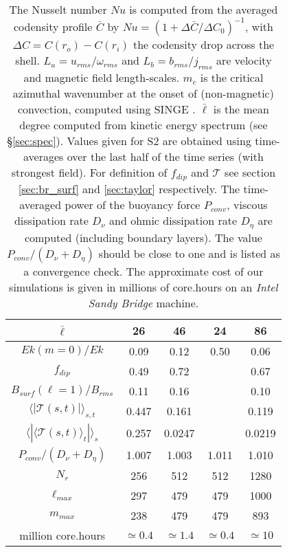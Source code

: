 \documentclass[12pt, a4paper]{article}
\begin{document}
\begin{table}
\begin{center}
\begin{tabular}{ccccc}
$\bar{\ell}$ & 26 & 46 & 24 & 86 \\
\hline
$Ek(m=0)/Ek$ & 0.09 & 0.12 & 0.50 & 0.06 \\
$f_{dip}$ & 0.49 & 0.72 & & 0.67 \\
$B_{surf}(\ell=1) / B_{rms}$ & 0.11 & 0.16 &   & 0.10  \\
\hline
$\langle|\mathcal{T}(s,t)|\rangle_{s,t}$    & 0.447 & 0.161 & & 0.119  \\
$\langle|\langle\mathcal{T}(s,t)\rangle_t|\rangle_s$  & 0.257 & 0.0247 & & 0.0219 \\
\hline
$P_{conv}/(D_\nu+D_\eta)$ & 1.007 & 1.003 & 1.011 & 1.010 \\
$N_r$     & 256 & 512 & 512 & 1280 \\
$\ell_{max}$ & 297 & 479 & 479 & 1000 \\
$m_{max}$ & 238 & 479 & 479 & 893 \\
million core.hours & $\simeq 0.4$ & $\simeq 1.4$ & $\simeq 0.4$ & $\simeq 10$
\end{tabular}
\end{center}
\caption{
The Nusselt number $Nu$ is computed from the averaged codensity profile $\bar{C}$ by $Nu = (1+\Delta\bar{C}/\Delta C_0)^{-1}$, with $\Delta C = C(r_o)-C(r_i)$ the codensity drop across the shell.
$L_u = u_{rms}/\omega_{rms}$ and $L_b=b_{rms}/j_{rms}$ are velocity and magnetic field length-scales.
$m_c$ is the critical azimuthal wavenumber at the onset of (non-magnetic) convection, computed using SINGE \citep{vidal2015}.
$\bar{\ell}$ is the mean degree computed from kinetic energy spectrum (see \S\ref{sec:spec}).
Values given for S2 are obtained using time-averages over the last half of the time series (with strongest field).
For definition of $f_{dip}$ and $\mathcal{T}$ see section \ref{sec:br_surf} and \ref{sec:taylor} respectively.
The time-averaged power of the buoyancy force $P_{conv}$, viscous dissipation rate $D_\nu$ and ohmic dissipation rate $D_\eta$ are computed (including boundary layers).
The value $P_{conv}/(D_\nu+D_\eta)$ should be close to one and is listed as a convergence check.
The approximate cost of our simulations is given in millions of core.hours on an \textit{Intel Sandy Bridge} machine.
}
\label{tab:mysimus}
\end{table}
\end{document}
